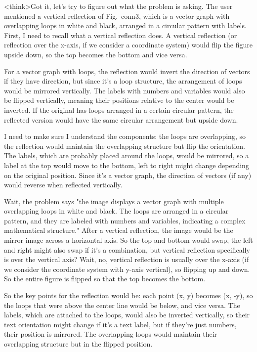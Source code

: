 <think>Got it, let's try to figure out what the problem is asking. The user mentioned a vertical reflection of Fig.~conn3, which is a vector graph with overlapping loops in white and black, arranged in a circular pattern with labels. First, I need to recall what a vertical reflection does. A vertical reflection (or reflection over the x-axis, if we consider a coordinate system) would flip the figure upside down, so the top becomes the bottom and vice versa. 

For a vector graph with loops, the reflection would invert the direction of vectors if they have direction, but since it's a loop structure, the arrangement of loops would be mirrored vertically. The labels with numbers and variables would also be flipped vertically, meaning their positions relative to the center would be inverted. If the original has loops arranged in a certain circular pattern, the reflected version would have the same circular arrangement but upside down. 

I need to make sure I understand the components: the loops are overlapping, so the reflection would maintain the overlapping structure but flip the orientation. The labels, which are probably placed around the loops, would be mirrored, so a label at the top would move to the bottom, left to right might change depending on the original position. Since it's a vector graph, the direction of vectors (if any) would reverse when reflected vertically. 

Wait, the problem says "the image displays a vector graph with multiple overlapping loops in white and black. The loops are arranged in a circular pattern, and they are labeled with numbers and variables, indicating a complex mathematical structure." After a vertical reflection, the image would be the mirror image across a horizontal axis. So the top and bottom would swap, the left and right might also swap if it's a combination, but vertical reflection specifically is over the vertical axis? Wait, no, vertical reflection is usually over the x-axis (if we consider the coordinate system with y-axis vertical), so flipping up and down. So the entire figure is flipped so that the top becomes the bottom. 

So the key points for the reflection would be: each point (x, y) becomes (x, -y), so the loops that were above the center line would be below, and vice versa. The labels, which are attached to the loops, would also be inverted vertically, so their text orientation might change if it's a text label, but if they're just numbers, their position is mirrored. The overlapping loops would maintain their overlapping structure but in the flipped position. 

